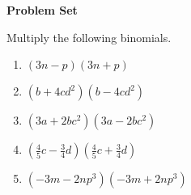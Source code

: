 \textbf{Problem Set}

\vspce

Multiply the following binomials.
\begin{enumerate}
\item \hspce $(3n-p)(3n+p)$
\item  \hspce $(b+4cd^{2})(b-4cd^{2})$
\item  \hspce $(3a+2bc^{2})(3a-2bc^{2})$
\item  \hspce $(\frac{4}{5}c-\frac{3}{4}d)	(\frac{4}{5}c+\frac{3}{4}d)	$
\item  \hspce $(-3m-2np^{3})(-3m+2np^{3})$
\end{enumerate}